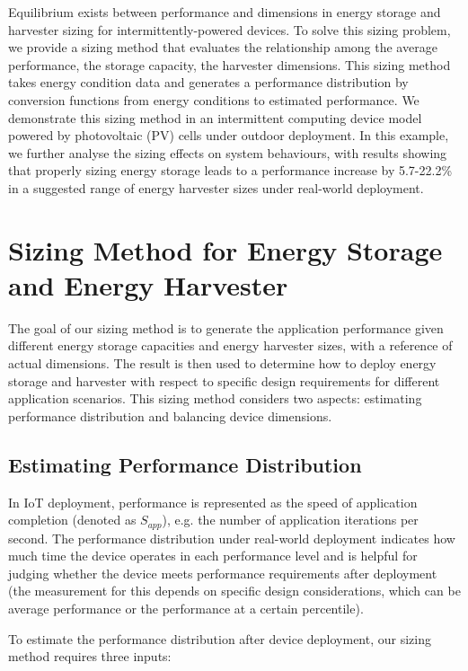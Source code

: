 Equilibrium exists between performance and dimensions in energy storage and harvester sizing for intermittently-powered devices. To solve this sizing problem, we provide a sizing method that evaluates the relationship among the average performance, the storage capacity, the harvester dimensions. This sizing method takes energy condition data and generates a performance distribution by conversion functions from energy conditions to estimated performance. We demonstrate this sizing method in an intermittent computing device model powered by photovoltaic (PV) cells under outdoor deployment. In this example, we further analyse the sizing effects on system behaviours, with results showing that properly sizing energy storage leads to a performance increase by 5.7-22.2\% in a suggested range of energy harvester sizes under real-world deployment.



\section{Sizing Method for Energy Storage and Energy Harvester}

The goal of our sizing method is to generate the application performance given different energy storage capacities and energy harvester sizes, with a reference of actual dimensions. The result is then used to determine how to deploy energy storage and harvester with respect to specific design requirements for different application scenarios. This sizing method considers two aspects: estimating performance distribution and balancing device dimensions. 

\subsection{Estimating Performance Distribution}

In IoT deployment, performance is represented as the speed of application completion (denoted as $S_{app}$), e.g. the number of application iterations per second. The performance distribution under real-world deployment indicates how much time the device operates in each performance level and is helpful for judging whether the device meets performance requirements after deployment (the measurement for this depends on specific design considerations, which can be average performance or the performance at a certain percentile). 

To estimate the performance distribution after device deployment, our sizing method requires three inputs:  

